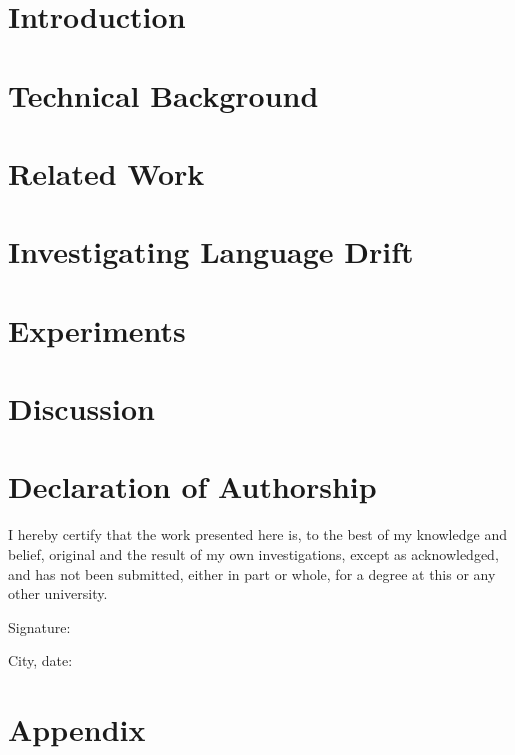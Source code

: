 \documentclass[11pt, twoside, openright]{report} %
\begin{document}
\chapter{Introduction}
\label{chapter01}


 \chapter{Technical Background}
 \label{chapter02}
 
 
\chapter{Related Work}
\label{chapter03}


\chapter{Investigating Language Drift}
\label{chapter04}


\chapter{Experiments}
\label{chapter05}


\chapter{Discussion}
\label{chapter06}


\chapter*{Declaration of Authorship}
I hereby certify that the work presented here is, to the best of my knowledge and belief, original and the result of my own investigations, except as acknowledged, and has not been submitted, either in part or whole, for a degree at this or any other university.

\vspace{2cm}
Signature:~\makebox[3in]{\hrulefill}

\vspace{1cm}
City, date:~\makebox[3in]{\hrulefill} 

\appendix
\chapter{Appendix}	
\label{appendix}


\printbibliography
%
\end{document}
